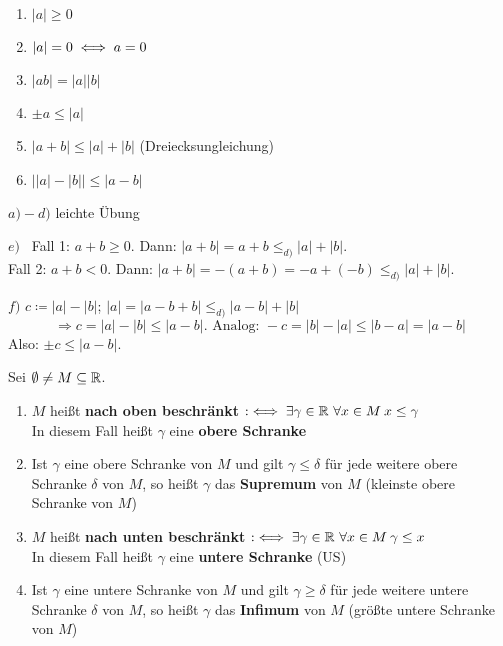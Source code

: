 \begin{regeln}
	\begin{enumerate}
		\item $|a| \geq 0$
		\item $|a| = 0 \iff a = 0$
		\item $|ab| = |a||b|$
		\item $\pm a \leq |a|$
		\item $|a + b| \leq |a| + |b|$ (Dreiecksungleichung)
		\item $\left| |a| - |b| \right| \leq |a - b|$
	\end{enumerate}	
\end{regeln}

\begin{beweis}
	\begin{description}
		\item $a) - d)$ leichte Übung
		\item $e)$~ Fall 1: $a +b \geq 0$. Dann: $|a + b| = a + b \leq_{d)} |a| + |b|$. \\
			Fall 2: $a + b < 0$. Dann: $|a + b| = - (a + b) = - a + (- b) \leq_{d)} |a| + |b|$.
		\item $f)$ $c \coloneqq |a| - |b|$; $|a| = |a - b + b| \leq_{d)} |a - b | + |b|$
			$$
				\Rightarrow c = |a| - |b| \leq |a - b|. \text{ Analog: } -c = |b| - |a| \leq |b - a| = |a - b| 
			$$
			Also: $\pm c \leq |a - b|$.
	\end{description}
\end{beweis}


\begin{definition*}    
	Sei $\emptyset \neq M \subseteq \mathbb{R}$. 
	\begin{enumerate}
		\item $M$ hei{\ss}t \textbf{nach oben beschränkt} $:\iff \exists \gamma \in \mathbb{R} ~ \forall x \in M \: x \leq \gamma$ \\
			In diesem Fall hei{\ss}t $\gamma$ eine \textbf{obere Schranke}
		\item Ist $\gamma$ eine obere Schranke von $M$ und gilt $\gamma \leq \delta$ für jede weitere obere Schranke $\delta$ von $M$, so hei{\ss}t $\gamma$ das \textbf{Supremum} von $M$ (kleinste obere Schranke von $M$)
		\item $M$ hei{\ss}t \textbf{nach unten beschränkt} $:\iff \exists \gamma \in \mathbb{R} ~ \forall x \in M \: \gamma \leq x$\\
			In diesem Fall hei{\ss}t $\gamma$ eine \textbf{untere Schranke} (US)
		\item Ist $\gamma$ eine untere Schranke von $M$ und gilt $\gamma \geq \delta$ für jede weitere untere Schranke $\delta$ von $M$, so hei{\ss}t $\gamma$ das \textbf{Infimum} von $M$ (größte untere Schranke von $M$)
	\end{enumerate}
\end{definition*}

